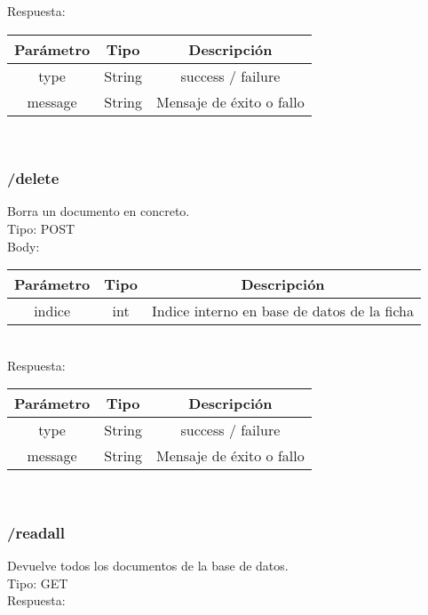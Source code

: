\documentclass[a4paper,12pt]{article}
\begin{document}
Respuesta:\\

\begin{tabular}{|c|c|c|}
    \hline
    \textbf{Parámetro} & \textbf{Tipo}  & \textbf{Descripción}\\ 
    \hline
    type & String & success / failure\\ 
    \hline
    message & String & Mensaje de éxito o fallo\\ 
    \hline
\end{tabular}\\

\subsubsection{/delete}
Borra un documento en concreto.\\

Tipo: POST\\

Body:\\

\begin{tabular}{|c|c|c|}
    \hline
    \textbf{Parámetro} & \textbf{Tipo}  & \textbf{Descripción}\\ 
    \hline
    indice & int & Indice interno en base de datos de la ficha\\ 
    \hline
\end{tabular}\\

Respuesta:\\

\begin{tabular}{|c|c|c|}
    \hline
    \textbf{Parámetro} & \textbf{Tipo}  & \textbf{Descripción}\\ 
    \hline
    type & String & success / failure\\ 
    \hline
    message & String & Mensaje de éxito o fallo\\ 
    \hline
\end{tabular}\\

\subsubsection{/readall}
Devuelve todos los documentos de la base de datos.\\

Tipo: GET\\

Respuesta:\\
\end{document}
